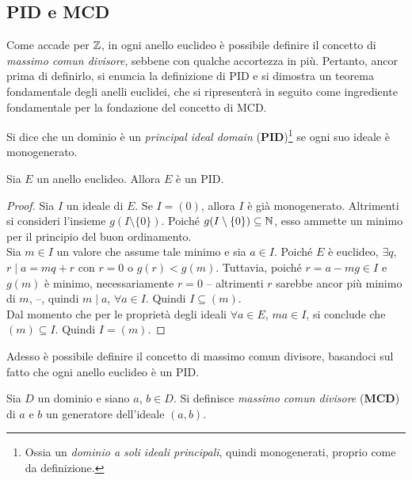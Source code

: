 \subsection{PID e MCD}

Come accade per $\mathbb Z$, in ogni anello euclideo è possibile definire il
concetto di \textit{massimo comun divisore}, sebbene con qualche accortezza
in più. Pertanto, ancor prima di definirlo, si enuncia la definizione di
PID e si dimostra un teorema fondamentale degli anelli euclidei, che
si ripresenterà in seguito come ingrediente fondamentale per la fondazione
del concetto di MCD.

\begin{definition}
    Si dice che un dominio è un \textit{principal ideal domain} (\textbf{PID})\footnote{Ossia un \textit{dominio
            a soli ideali principali}, quindi monogenerati, proprio come da definizione.} se ogni suo ideale è monogenerato.
\end{definition}

\begin{theorem}
    Sia $E$ un anello euclideo. Allora $E$ è un PID.
\end{theorem}

\begin{proof}
    Sia $I$ un ideale di $E$. Se $I = (0)$, allora $I$ è già monogenerato.
    Altrimenti si consideri l'insieme $g(I \setminus \{0\})$. Poiché
    $g(I \setminus \{0\}) \subseteq \mathbb N$,
    esso ammette un minimo per il principio del buon ordinamento. \\

    Sia $m \in I$ un valore che assume tale minimo e sia $a \in I$.
    Poiché $E$ è euclideo, $\exists q$, $r \mid a = mq + r$ con $r=0$ o
    $g(r)<g(m)$. Tuttavia, poiché $r = a-mg \in I$ e $g(m)$ è minimo, necessariamente $r=0$ -- altrimenti $r$ sarebbe
    ancor più minimo di $m$, \Lightning{} --,
    quindi $m \mid a$, $\forall a \in I$. Quindi $I \subseteq (m)$. \\

    Dal momento che per le proprietà degli ideali $\forall a \in E$, $ma \in I$,
    si conclude che $(m) \subseteq I$. Quindi $I = (m)$.
\end{proof}

Adesso è possibile definire il concetto di massimo comun divisore, basandoci
sul fatto che ogni anello euclideo è un PID.

\begin{definition}
    Sia $D$ un dominio e siano $a$, $b \in D$. Si definisce
    \textit{massimo comun divisore} (\textbf{MCD}) di $a$ e $b$ un
    generatore dell'ideale $(a,b)$.
\end{definition}

